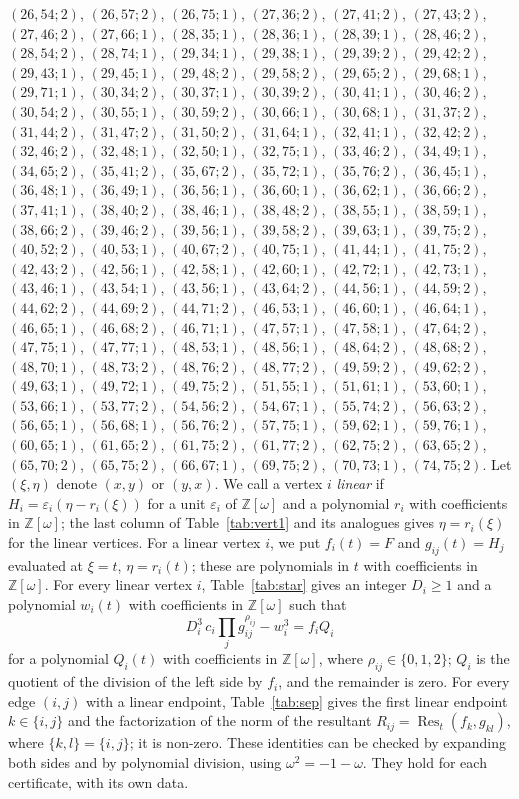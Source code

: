 \documentclass[11pt]{article}
\newcommand{\Z}{\mathbb{Z}}
\begin{document}
$(26,54;2)$, $(26,57;2)$, $(26,75;1)$, $(27,36;2)$, $(27,41;2)$, $(27,43;2)$, $(27,46;2)$, $(27,66;1)$, $(28,35;1)$, $(28,36;1)$, $(28,39;1)$, $(28,46;2)$, $(28,54;2)$, $(28,74;1)$, $(29,34;1)$, $(29,38;1)$, $(29,39;2)$, $(29,42;2)$, $(29,43;1)$, $(29,45;1)$, $(29,48;2)$, $(29,58;2)$, $(29,65;2)$, $(29,68;1)$, $(29,71;1)$, $(30,34;2)$, $(30,37;1)$, $(30,39;2)$, $(30,41;1)$, $(30,46;2)$, $(30,54;2)$, $(30,55;1)$, $(30,59;2)$, $(30,66;1)$, $(30,68;1)$, $(31,37;2)$, $(31,44;2)$, $(31,47;2)$, $(31,50;2)$, $(31,64;1)$, $(32,41;1)$, $(32,42;2)$, $(32,46;2)$, $(32,48;1)$, $(32,50;1)$, $(32,75;1)$, $(33,46;2)$, $(34,49;1)$, $(34,65;2)$, $(35,41;2)$, $(35,67;2)$, $(35,72;1)$, $(35,76;2)$, $(36,45;1)$, $(36,48;1)$, $(36,49;1)$, $(36,56;1)$, $(36,60;1)$, $(36,62;1)$, $(36,66;2)$, $(37,41;1)$, $(38,40;2)$, $(38,46;1)$, $(38,48;2)$, $(38,55;1)$, $(38,59;1)$, $(38,66;2)$, $(39,46;2)$, $(39,56;1)$, $(39,58;2)$, $(39,63;1)$, $(39,75;2)$, $(40,52;2)$, $(40,53;1)$, $(40,67;2)$, $(40,75;1)$, $(41,44;1)$, $(41,75;2)$, $(42,43;2)$, $(42,56;1)$, $(42,58;1)$, $(42,60;1)$, $(42,72;1)$, $(42,73;1)$, $(43,46;1)$, $(43,54;1)$, $(43,56;1)$, $(43,64;2)$, $(44,56;1)$, $(44,59;2)$, $(44,62;2)$, $(44,69;2)$, $(44,71;2)$, $(46,53;1)$, $(46,60;1)$, $(46,64;1)$, $(46,65;1)$, $(46,68;2)$, $(46,71;1)$, $(47,57;1)$, $(47,58;1)$, $(47,64;2)$, $(47,75;1)$, $(47,77;1)$, $(48,53;1)$, $(48,56;1)$, $(48,64;2)$, $(48,68;2)$, $(48,70;1)$, $(48,73;2)$, $(48,76;2)$, $(48,77;2)$, $(49,59;2)$, $(49,62;2)$, $(49,63;1)$, $(49,72;1)$, $(49,75;2)$, $(51,55;1)$, $(51,61;1)$, $(53,60;1)$, $(53,66;1)$, $(53,77;2)$, $(54,56;2)$, $(54,67;1)$, $(55,74;2)$, $(56,63;2)$, $(56,65;1)$, $(56,68;1)$, $(56,76;2)$, $(57,75;1)$, $(59,62;1)$, $(59,76;1)$, $(60,65;1)$, $(61,65;2)$, $(61,75;2)$, $(61,77;2)$, $(62,75;2)$, $(63,65;2)$, $(65,70;2)$, $(65,75;2)$, $(66,67;1)$, $(69,75;2)$, $(70,73;1)$, $(74,75;2)$.
Let $(\xi,\eta)$ denote $(x,y)$ or $(y,x)$. We call a vertex $i$ \emph{linear} if $H_i=\varepsilon_i(\eta-r_i(\xi))$ for a unit $\varepsilon_i$ of $\Z[\omega]$ and a polynomial $r_i$ with coefficients in $\Z[\omega]$; the last column of Table~\ref{tab:vert1} and its analogues gives $\eta=r_i(\xi)$ for the linear vertices. For a linear vertex $i$, we put $f_i(t)=F$ and $g_{ij}(t)=H_j$ evaluated at $\xi=t$, $\eta=r_i(t)$; these are polynomials in $t$ with coefficients in $\Z[\omega]$.
For every linear vertex $i$, Table~\ref{tab:star} gives an integer $D_i\geq1$ and a polynomial $w_i(t)$ with coefficients in $\Z[\omega]$ such that
\begin{equation}\label{eq:starlin}
D_i^3\,c_i\prod_jg_{ij}^{\rho_{ij}}-w_i^3=f_iQ_i
\end{equation}
for a polynomial $Q_i(t)$ with coefficients in $\Z[\omega]$, where $\rho_{ij}\in\{0,1,2\}$; $Q_i$ is the quotient of the division of the left side by $f_i$, and the remainder is zero.
For every edge $(i,j)$ with a linear endpoint, Table~\ref{tab:sep} gives the first linear endpoint $k\in\{i,j\}$ and the factorization of the norm of the resultant $R_{ij}=\operatorname{Res}_t(f_k,g_{kl})$, where $\{k,l\}=\{i,j\}$; it is non-zero.
These identities can be checked by expanding both sides and by polynomial division, using $\omega^2=-1-\omega$. They hold for each certificate, with its own data.
\end{document}
